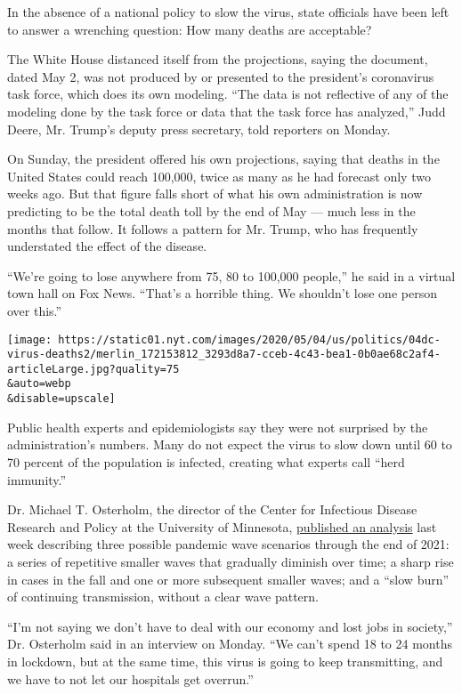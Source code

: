 In the absence of a national policy to slow the virus, state officials
have been left to answer a wrenching question: How many deaths are
acceptable?

The White House distanced itself from the projections, saying the
document, dated May 2, was not produced by or presented to the
president's coronavirus task force, which does its own modeling. ``The
data is not reflective of any of the modeling done by the task force or
data that the task force has analyzed,'' Judd Deere, Mr. Trump's deputy
press secretary, told reporters on Monday.

On Sunday, the president offered his own projections, saying that deaths
in the United States could reach 100,000, twice as many as he had
forecast only two weeks ago. But that figure falls short of what his own
administration is now predicting to be the total death toll by the end
of May --- much less in the months that follow. It follows a pattern for
Mr. Trump, who has frequently understated the effect of the disease.

``We're going to lose anywhere from 75, 80 to 100,000 people,'' he said
in a virtual town hall on Fox News. ``That's a horrible thing. We
shouldn't lose one person over this.''

\texttt{[image: https://static01.nyt.com/images/2020/05/04/us/politics/04dc-virus-deaths2/merlin\_172153812\_3293d8a7-cceb-4c43-bea1-0b0ae68c2af4-articleLarge.jpg?quality=75\\\&auto=webp\\\&disable=upscale]}

Public health experts and epidemiologists say they were not surprised by
the administration's numbers. Many do not expect the virus to slow down
until 60 to 70 percent of the population is infected, creating what
experts call ``herd immunity.''

Dr. Michael T. Osterholm, the director of the Center for Infectious
Disease Research and Policy at the University of Minnesota,
\href{https://www.cidrap.umn.edu/sites/default/files/public/downloads/cidrap-covid19-viewpoint-part1_0.pdf}{published
an analysis} last week describing three possible pandemic wave scenarios
through the end of 2021: a series of repetitive smaller waves that
gradually diminish over time; a sharp rise in cases in the fall and one
or more subsequent smaller waves; and a ``slow burn'' of continuing
transmission, without a clear wave pattern.

``I'm not saying we don't have to deal with our economy and lost jobs in
society,'' Dr. Osterholm said in an interview on Monday. ``We can't
spend 18 to 24 months in lockdown, but at the same time, this virus is
going to keep transmitting, and we have to not let our hospitals get
overrun.''

